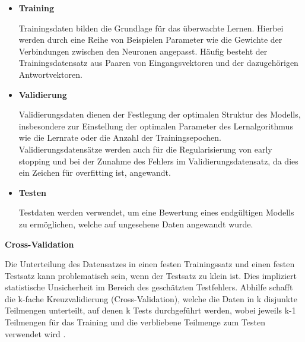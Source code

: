 \begin{itemize} 
\item \textbf{Training} \vspace{5pt}

Trainingsdaten bilden die Grundlage für das überwachte Lernen. Hierbei werden durch eine Reihe von Beispielen Parameter wie die Gewichte der Verbindungen zwischen den Neuronen angepasst. Häufig besteht der Trainingsdatensatz aus Paaren von Eingangsvektoren und der dazugehörigen Antwortvektoren. \vspace{10pt}

\item \textbf{Validierung} \vspace{5pt}

Validierungsdaten dienen der Festlegung der optimalen Struktur des Modells, insbesondere zur Einstellung der optimalen Parameter des Lernalgorithmus wie die Lernrate oder die Anzahl der Trainingsepochen. Validierungsdatensätze werden auch für die Regularisierung von  \dq early stopping\grqq{} und bei der Zunahme des Fehlers im Validierungsdatensatz, da dies ein Zeichen für  \dq overfitting\grqq{} ist, angewandt. \vspace{10pt}

\item \textbf{Testen} \vspace{5pt}

Testdaten werden verwendet, um eine Bewertung eines endgültigen Modells zu ermöglichen, welche auf ungesehene Daten angewandt wurde.

\end{itemize}\vspace{10pt}


\textbf{Cross-Validation} \vspace{10pt}

Die Unterteilung des Datensatzes in einen festen Trainingssatz und einen festen Testsatz kann problematisch sein, wenn der Testsatz zu klein ist. Dies impliziert statistische Unsicherheit im Bereich des geschätzten Testfehlers. Abhilfe schafft die k-fache Kreuzvalidierung (Cross-Validation), welche die Daten in k disjunkte Teilmengen unterteilt, auf denen k Tests durchgeführt werden, wobei jeweils k-1 Teilmengen für das Training und die verbliebene Teilmenge zum Testen verwendet wird \cite{hoffmann2014proceedings}.



